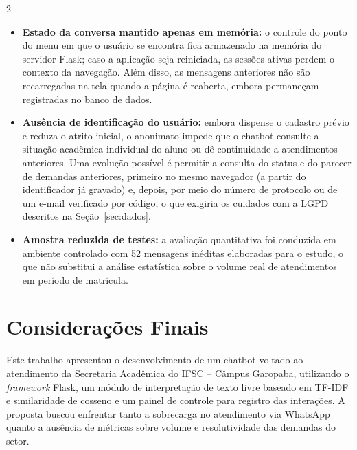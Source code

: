 \documentclass[10pt]{article}
\begin{document}
\begin{multicols}{2}
\begin{itemize}
  \item \textbf{Estado da conversa mantido apenas em memória:} o controle
  do ponto do menu em que o usuário se encontra fica armazenado na memória
  do servidor Flask; caso a aplicação seja reiniciada, as sessões ativas
  perdem o contexto da navegação. Além disso, as mensagens anteriores não são recarregadas na tela quando a página é reaberta, embora permaneçam registradas no banco de dados.

  \item \textbf{Ausência de identificação do usuário:} embora dispense o
  cadastro prévio e reduza o atrito inicial, o anonimato impede que o
  chatbot consulte a situação acadêmica individual do aluno ou dê continuidade a atendimentos anteriores. Uma evolução possível é permitir a consulta do status e do parecer de demandas anteriores, primeiro no mesmo navegador (a partir do identificador já gravado) e, depois, por meio do número de protocolo ou de um e-mail verificado por código, o que exigiria os cuidados com a LGPD descritos na Seção~\ref{sec:dados}.

  \item \textbf{Amostra reduzida de testes:} a avaliação quantitativa foi
  conduzida em ambiente controlado com 52 mensagens inéditas elaboradas
  para o estudo, o que não substitui a análise estatística sobre o volume
  real de atendimentos em período de matrícula.
\end{itemize}


\section{Considerações Finais}

Este trabalho apresentou o desenvolvimento de um chatbot voltado ao
atendimento da Secretaria Acadêmica do IFSC -- Câmpus Garopaba,
utilizando o \textit{framework} Flask, um módulo de interpretação de texto
livre baseado em TF-IDF e similaridade de cosseno e um painel de
controle para registro das interações. A proposta buscou enfrentar tanto
a sobrecarga no atendimento via WhatsApp quanto a ausência de métricas
sobre volume e resolutividade das demandas do setor.


\end{multicols}
\end{document}
